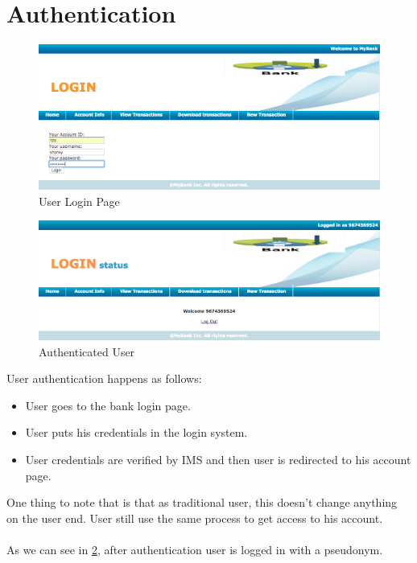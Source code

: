 \section{Authentication}
\begin{figure}[h]
	\centering
	\includegraphics[width=\textwidth]{figures/Login}
	\caption{User Login Page}
	\label{fig:Login}
\end{figure}
\begin{figure}[h]
	\centering
	\includegraphics[width=\textwidth]{figures/Logged}
	\caption{Authenticated User}
	\label{fig:Logged}
\end{figure}	
User authentication happens as follows:
\begin{itemize}
	\item User goes to the bank login page.
	\item User puts his credentials in the login system.
	\item User credentials are verified by IMS and then user is redirected to his account page.
\end{itemize}
One thing to note that is that as traditional user, this doesn't change anything on the user end. User still use the same process to get access to his account.
\\
\\As we can see in \ref{fig:Logged}, after authentication user is logged in with a pseudonym.	
